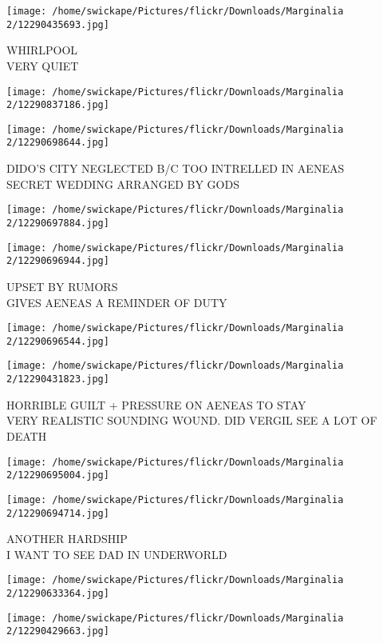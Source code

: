 \documentclass[10pt,letterpaper]{article}
\begin{document}
\vspace{0.25in}
\texttt{[image: /home/swickape/Pictures/flickr/Downloads/Marginalia 2/12290435693.jpg]}

WHIRLPOOL\\
VERY QUIET
\pagebreak

\texttt{[image: /home/swickape/Pictures/flickr/Downloads/Marginalia 2/12290837186.jpg]}

\vspace{0.25in}
\texttt{[image: /home/swickape/Pictures/flickr/Downloads/Marginalia 2/12290698644.jpg]}

DIDO'S CITY NEGLECTED B/C TOO INTRELLED IN AENEAS\\
SECRET WEDDING ARRANGED BY GODS
\pagebreak

\texttt{[image: /home/swickape/Pictures/flickr/Downloads/Marginalia 2/12290697884.jpg]}

\vspace{0.25in}
\texttt{[image: /home/swickape/Pictures/flickr/Downloads/Marginalia 2/12290696944.jpg]}

UPSET BY RUMORS\\
GIVES AENEAS A REMINDER OF DUTY
\pagebreak

\texttt{[image: /home/swickape/Pictures/flickr/Downloads/Marginalia 2/12290696544.jpg]}

\vspace{0.25in}
\texttt{[image: /home/swickape/Pictures/flickr/Downloads/Marginalia 2/12290431823.jpg]}

HORRIBLE GUILT + PRESSURE ON AENEAS TO STAY\\
VERY REALISTIC SOUNDING WOUND.  DID VERGIL SEE A LOT OF DEATH
\pagebreak

\texttt{[image: /home/swickape/Pictures/flickr/Downloads/Marginalia 2/12290695004.jpg]}

\vspace{0.25in}
\texttt{[image: /home/swickape/Pictures/flickr/Downloads/Marginalia 2/12290694714.jpg]}

ANOTHER HARDSHIP\\
I WANT TO SEE DAD IN UNDERWORLD
\pagebreak

\texttt{[image: /home/swickape/Pictures/flickr/Downloads/Marginalia 2/12290633364.jpg]}

\vspace{0.25in}
\texttt{[image: /home/swickape/Pictures/flickr/Downloads/Marginalia 2/12290429663.jpg]}
\end{document}

